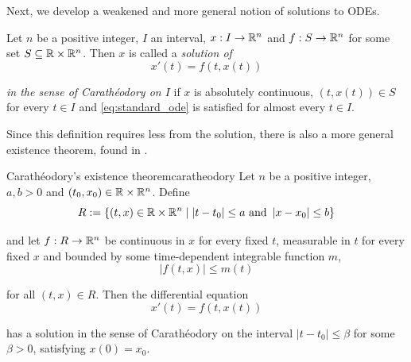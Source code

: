 Next, we develop a weakened and more general notion of solutions to ODEs.

\begin{definition}{}{}
    Let $n$ be a positive integer, $I$ an interval, $x: I \to \mathbb{R}^n$ and $f: S \to \mathbb{R}^n$ for some set $S \subseteq \mathbb{R} \times \mathbb{R}^n$. Then $x$ is called a \emph{solution of}
%
    \begin{equation}\label{eq:standard_ode}
        x'(t) = f(t, x(t))
    \end{equation}

    \emph{in the sense of Carath\'eodory on $I$} if $x$ is absolutely continuous, $(t, x(t)) \in S$ for every $t \in I$ and \cref{eq:standard_ode} is satisfied for almost every $t \in I$.
\end{definition}

\noindent
Since this definition requires less from the solution, there is also a more general existence theorem, found in \cite{coddington_theory_1984}.

\begin{theorem}{Carath\'eodory's existence theorem}{caratheodory}
    Let $n$ be a positive integer, $a, b > 0$ and $(t_0, x_0) \in \mathbb{R} \times \mathbb{R}^n$. Define
%
    \begin{equation*}
        R := \{ (t, x) \in \mathbb{R} \times \mathbb{R}^n \mid |t - t_0| \leq a \text{ and } \left|x - x_0\right| \leq b \}
    \end{equation*}

    and let $f: R \to \mathbb{R}^n$ be continuous in $x$ for every fixed $t$, measurable in $t$ for every fixed $x$ and bounded by some time-dependent integrable function $m$,
    \begin{equation*}
        \left|f(t, x)\right| \leq m(t)
    \end{equation*}

    for all $(t, x) \in R$. Then the differential equation
%
    \begin{equation*}
        x'(t) = f(t, x(t))
    \end{equation*}

    has a solution in the sense of Carath\'eodory on the interval $|t - t_0| \leq \beta$ for some $\beta > 0$, satisfying $x(0) = x_0$.
\end{theorem}